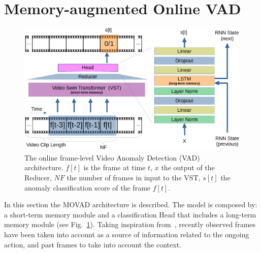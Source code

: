\section{Memory-augmented Online VAD}
\label{sec:theory}

\fboxsep=1mm%
\fboxrule=1pt%

\begin{figure}[!t]
            \centerline{\includegraphics[clip, width=\linewidth]{images/arch-rx-cropped.pdf}}
        \caption{The online frame-level Video Anomaly Detection (VAD) architecture. $f[t]$ is the frame at time $t$, $x$ the output of the Reducer, $\mathit{NF}$ the number of frames in input to the VST, $s[t]$ the anomaly classification score of the frame $f[t]$.\label{fig:arch}}
\end{figure}

In this section the MOVAD architecture is described.  
The model is composed by: a short-term memory module and a classification Head that includes a long-term memory module (see Fig.~\ref{fig:arch}). 
Taking inspiration from~\cite{xu2021long}, recently observed frames have been taken into account as a source of information related to the ongoing action, and past frames to take into account the context.


